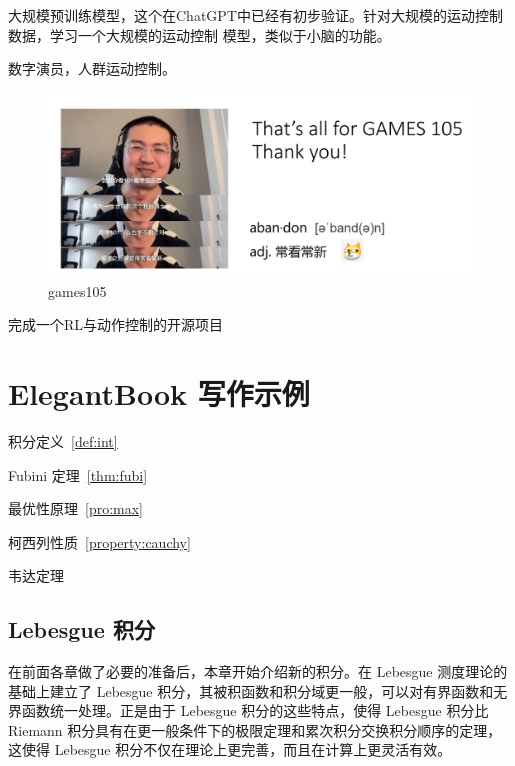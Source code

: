 \documentclass[lang=cn,newtx,10pt,scheme=chinese]{elegantbook}
\begin{document}
大规模预训练模型，这个在ChatGPT中已经有初步验证。针对大规模的运动控制数据，学习一个大规模的运动控制
模型，类似于小脑的功能。

数字演员，人群运动控制。

\begin{figure}[htbp]
  \centering
  \includegraphics[totalheight=2in]{"./image/games105.png"}
  \caption{games105} \label{fig:games105}
\end{figure}

\newpage
\begin{problemset}
  \item 完成一个RL与动作控制的开源项目
\end{problemset}

\chapter{ElegantBook 写作示例}

\begin{introduction}
  \item 积分定义~\ref{def:int}
  \item Fubini 定理~\ref{thm:fubi}
  \item 最优性原理~\ref{pro:max}
  \item 柯西列性质~\ref{property:cauchy}
  \item 韦达定理
\end{introduction}

\section{Lebesgue 积分}
在前面各章做了必要的准备后，本章开始介绍新的积分。在 Lebesgue 测度理论的基础上建立了 Lebesgue 积分，其被积函数和积分域更一般，可以对有界函数和无界函数统一处理。正是由于 Lebesgue 积分的这些特点，使得 Lebesgue 积分比 Riemann 积分具有在更一般条件下的极限定理和累次积分交换积分顺序的定理，这使得 Lebesgue 积分不仅在理论上更完善，而且在计算上更灵活有效。
\end{document}
